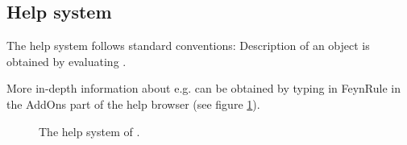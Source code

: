 \subsection{Help system}

The help system follows standard \mma conventions: Description of an object  is obtained by evaluating .

\beom
{}
\enom

More in-depth information about e.g.  can be obtained by typing in FeynRule in the AddOns part of the help browser (see figure \ref{help}).

\begin{figure}[ht]
\ifthenelse{\pdf = 0 \or \isundefined{\pdfoutput}}{\setlength\abovecaptionskip{-80pt}}{}
\begin{center}
\caption{The help system of \fc.}
\label{help}
\end{center}
\end{figure}

